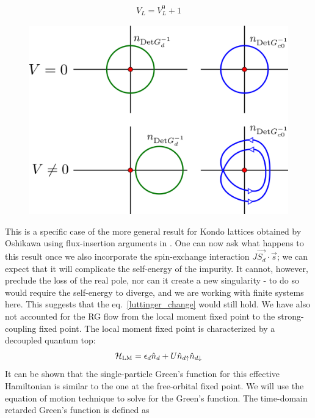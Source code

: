 \documentclass[12pt,twoside]{report}
\numberwithin{equation}{section}
\begin{document}
\begin{equation}\begin{aligned}
	\label{luttinger_change}
	V_L = V_L^0 + 1
\end{aligned}\end{equation}
\begin{figure}[htpb]
	\centering
	\includegraphics[scale=0.2]{../figures/luttinger_top_change.png}
\end{figure}
This is a specific case of the more general result for Kondo lattices obtained by Oshikawa using flux-insertion arguments in \cite{oshikawa}.
One can now ask what happens to this result once we also incorporate the spin-exchange interaction \(J \vec{S_d}\cdot\vec{s}\); we can expect that it will complicate the self-energy of the impurity. It cannot, however, preclude the loss of the real pole, nor can it create a new singularity - to do so would require the self-energy to diverge, and we are working with finite systems here. This suggests that the eq.~\ref{luttinger_change} would still hold.
\pb We have also not accounted for the RG flow from the local moment fixed point to the strong-coupling fixed point. The local moment fixed point is characterized by a decoupled quantum top:
\begin{equation}\begin{aligned}
	\mathcal{H}_\text{LM} = \epsilon_d \hat n_d + U \hat n_{d \uparrow} \hat n_{d \downarrow}
\end{aligned}\end{equation}
It can be shown that the single-particle Green's function for this effective Hamiltonian is similar to the one at the free-orbital fixed point. We will use the equation of motion technique to solve for the Green's function. The time-domain retarded Green's function is defined as
\end{document}
